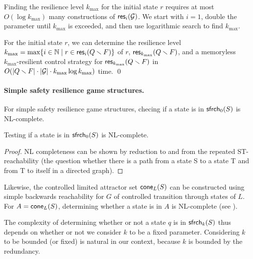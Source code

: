 Finding the resilience level $k_{\max}$ for the initial state $r$
requires at most $O(\log k_{\max})$ many constructions of $\mathsf{res}_i({\cal G})$.
We start with $i=1$, double the parameter until $k_{\max}$ 
is exceeded, and then use logarithmic search to find $k_{\max}$.

\begin{corollary}
For the initial state $r$, we can determine the resilience level 
$k_{\max} =
\max\{i\in {\mathbb N} \mid r \in \mathsf{res}_i(Q \smallsetminus F)\}$ of $r$,
$\mathsf{res}_{k_{\max}}(Q \smallsetminus F)$, 
and a memoryless $k_{\max}$-resilient control
strategy for $\mathsf{res}_{k_{\max}}(Q\smallsetminus F)$ in 
$O(|Q\smallsetminus F| \cdot |{\cal G}|\cdot k_{\max} \log k_{\max})$ time.
\qed
\end{corollary}




\paragraph{Simple safety resilience game structures.}
For simple  safety resilience game structures, checing if a state is in $\mathsf{sfrch}_0(S)$ is NL-complete\label{reply1.NL.complete}.
\begin{lemma}
\label{lem:oldNLSafe0}
Testing if a state is in $\mathsf{sfrch}_0(S)$ is NL-complete.
\end{lemma}

\begin{proof}
NL completeness can be shown by reduction to and from the repeated ST-reachability \cite{Papadimitriou94} (the question whether there is a path from a state S to a state T and from T to itself in a directed graph).
\end{proof}

Likewise, the controlled limited attractor set 
$\mathsf{cone}_L(S)$ can be constructed using simple backwards reachability 
for $G$ of controlled transition through states of $L$.
For 
$A = \mathsf{cone}_L(S)$, determining whether a state is in $A$ 
is NL-complete (see \cite{Papadimitriou94}).

The complexity of determining whether or not a state $q$ is 
in $\mathsf{sfrch}_k(S)$ thus depends on whether or not we consider $k$ 
to be a fixed parameter.
Considering $k$ to be bounded (or fixed) is natural in our context, 
because $k$ is bounded by the redundancy.

